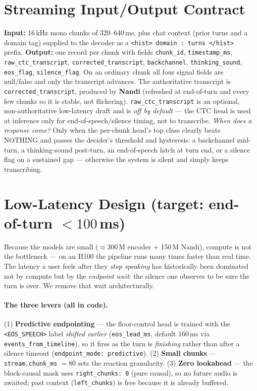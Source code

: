 \documentclass[11pt]{article}
\newcommand{\code}[1]{\texttt{#1}}
\newcommand{\flag}[1]{\texttt{<#1>}}
\begin{document}
\section{Streaming Input/Output Contract}
\textbf{Input:} 16\,kHz mono chunks of 320--640\,ms, plus chat context (prior turns and a
domain tag) supplied to the decoder as a \code{<hist> domain : turns </hist>} prefix.
\textbf{Output:} one record per chunk with fields \code{chunk\_id}, \code{timestamp\_ms},
\code{raw\_ctc\_transcript}, \code{corrected\_transcript}, \code{backchannel},
\code{thinking\_sound}, \code{eos\_flag}, \code{silence\_flag}. On an ordinary chunk all four
signal fields are null/false and only the transcript advances. The authoritative transcript is
\code{corrected\_transcript}, produced by \textbf{Nandi} (refreshed at end-of-turn and every
few chunks so it is stable, not flickering). \code{raw\_ctc\_transcript} is an optional,
non-authoritative low-latency draft and is \emph{off by default} --- the CTC head is used at
inference only for end-of-speech/silence timing, not to transcribe. \emph{When does a response come?} Only when the
per-chunk head's top class clearly beats NOTHING and passes the decider's threshold and
hysteresis: a backchannel mid-turn, a thinking-sound post-turn, an end-of-speech latch at
turn end, or a silence flag on a sustained gap --- otherwise the system is silent and simply
keeps transcribing.

\section{Low-Latency Design (target: end-of-turn $<100$\,ms)}\label{sec:latency}
Because the models are small ($\approx$300\,M encoder $+$ 150\,M Nandi), compute is not the
bottleneck --- on an H100 the pipeline runs many times faster than real time. The latency a
user feels after they \emph{stop speaking} has historically been dominated not by compute but
by the \emph{endpoint wait}: the silence one observes to be sure the turn is over. We remove
that wait architecturally.

\paragraph{The three levers (all in code).}
(1) \textbf{Predictive endpointing} --- the floor-control head is trained with the
\flag{EOS\_SPEECH} label \emph{shifted earlier} (\code{eos\_lead\_ms}, default $160$\,ms via
\code{events\_from\_timeline}), so it fires as the turn is \emph{finishing} rather than after a
silence timeout (\code{endpoint\_mode: predictive}). (2) \textbf{Small chunks} ---
\code{stream.chunk\_ms} $=80$ sets the reaction granularity. (3) \textbf{Zero lookahead} ---
the block-causal mask uses \code{right\_chunks: 0} (pure causal), so no future audio is
awaited; past context (\code{left\_chunks}) is free because it is already buffered.
\end{document}
